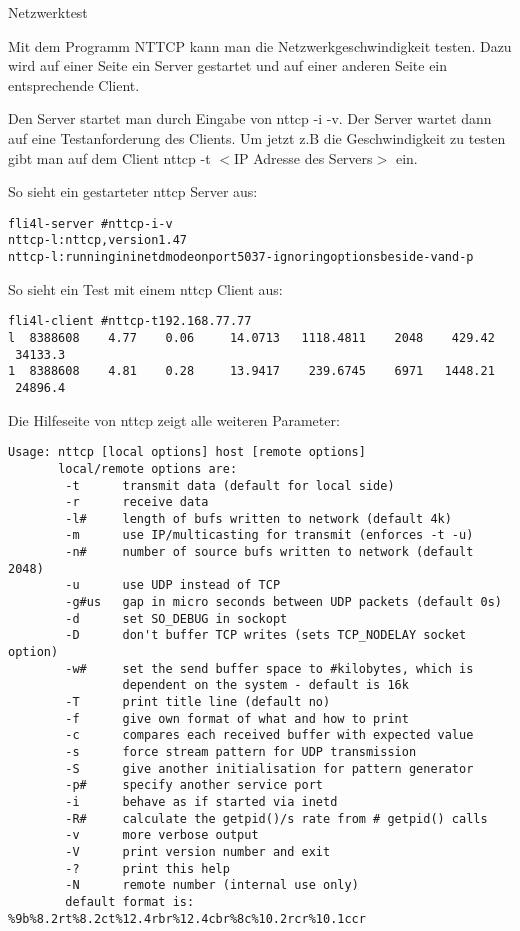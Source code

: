 \begin{description}
 Netzwerktest

    Mit dem Programm NTTCP kann man die Netzwerkgeschwindigkeit
    testen. Dazu wird auf einer Seite ein Server gestartet und auf
    einer anderen Seite ein entsprechende Client.

    Den Server startet man durch Eingabe von nttcp -i -v. Der Server
    wartet dann auf eine Testanforderung des Clients. Um jetzt z.B die
    Geschwindigkeit zu testen gibt man auf dem Client nttcp -t $<$IP
    Adresse des Servers$>$ ein.

    So sieht ein gestarteter nttcp Server aus:

\begin{example}
\begin{alltt}
fli4l-server \version~\# nttcp -i -v
nttcp-l: nttcp, version 1.47
nttcp-l: running in inetd mode on port 5037 - ignoring options beside -v and -p
\end{alltt}
\end{example}

    So sieht ein Test mit einem nttcp Client aus:

\begin{example}
\begin{alltt}
fli4l-client \version~\# nttcp -t 192.168.77.77
l~~8388608~~~~4.77~~~~0.06~~~~~14.0713~~~1118.4811~~~~2048~~~~429.42~~~34133.3
1~~8388608~~~~4.81~~~~0.28~~~~~13.9417~~~~239.6745~~~~6971~~~1448.21~~~24896.4
\end{alltt}
\end{example}

    Die Hilfeseite von nttcp zeigt alle weiteren Parameter:

\begin{verbatim}
Usage: nttcp [local options] host [remote options]
       local/remote options are:
        -t      transmit data (default for local side)
        -r      receive data
        -l#     length of bufs written to network (default 4k)
        -m      use IP/multicasting for transmit (enforces -t -u)
        -n#     number of source bufs written to network (default 2048)
        -u      use UDP instead of TCP
        -g#us   gap in micro seconds between UDP packets (default 0s)
        -d      set SO_DEBUG in sockopt
        -D      don't buffer TCP writes (sets TCP_NODELAY socket option)
        -w#     set the send buffer space to #kilobytes, which is
                dependent on the system - default is 16k
        -T      print title line (default no)
        -f      give own format of what and how to print
        -c      compares each received buffer with expected value
        -s      force stream pattern for UDP transmission
        -S      give another initialisation for pattern generator
        -p#     specify another service port
        -i      behave as if started via inetd
        -R#     calculate the getpid()/s rate from # getpid() calls
        -v      more verbose output
        -V      print version number and exit
        -?      print this help
        -N      remote number (internal use only)
        default format is: %9b%8.2rt%8.2ct%12.4rbr%12.4cbr%8c%10.2rcr%10.1ccr
\end{verbatim}


\end{description}
